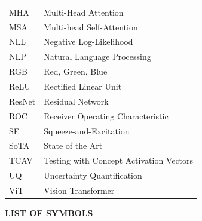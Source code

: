 \documentclass[12pt,a4paper]{report}
\begin{document}
\begin{longtable}{@{} >{\footnotesize}p{3.2cm} >{\footnotesize}p{10.6cm} @{}}
MHA    & Multi-Head Attention \\[3pt]
MSA    & Multi-head Self-Attention \\[3pt]
NLL    & Negative Log-Likelihood \\[3pt]
NLP    & Natural Language Processing \\[3pt]
RGB    & Red, Green, Blue \\[3pt]
ReLU   & Rectified Linear Unit \\[3pt]
ResNet & Residual Network \\[3pt]
ROC    & Receiver Operating Characteristic \\[3pt]
SE     & Squeeze-and-Excitation \\[3pt]
SoTA   & State of the Art \\[3pt]
TCAV   & Testing with Concept Activation Vectors \\[3pt]
UQ     & Uncertainty Quantification \\[3pt]
ViT    & Vision Transformer \\[3pt]
\bottomrule
\end{longtable}

\newpage
\begin{center}
{\large\bfseries LIST OF SYMBOLS}
\end{center}

\vspace{0.5cm}
\end{document}

